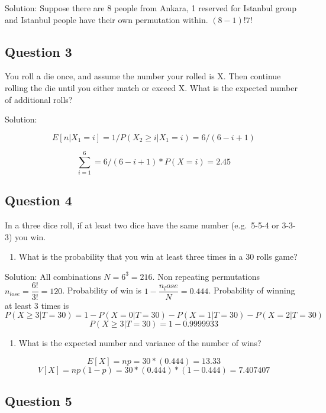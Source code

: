\documentclass[]{book}
\providecommand{\tightlist}{%
  \setlength{\itemsep}{0pt}\setlength{\parskip}{0pt}}
\theoremstyle{definition}
\theoremstyle{definition}
\theoremstyle{definition}
\theoremstyle{remark}
\begin{document}
Solution: Suppose there are 8 people from Ankara, 1 reserved for
Istanbul group and Istanbul people have their own permutation within.
\((8-1)!7!\)

\hypertarget{question-3}{%
\subsection{Question 3}\label{question-3}}

You roll a die once, and assume the number your rolled is X. Then
continue rolling the die until you either match or exceed X. What is the
expected number of additional rolls?

Solution:

\[E[n|X_1=i] = 1/P(X_2 \ge i| X_1 = i) = 6/(6-i+1)\]

\[\sum_{i=1}^6 = 6/(6-i+1) * P(X=i) = 2.45\]

\hypertarget{question-4}{%
\subsection{Question 4}\label{question-4}}

In a three dice roll, if at least two dice have the same number
(e.g.~5-5-4 or 3-3-3) you win.

\begin{enumerate}
\def\labelenumi{\alph{enumi})}
\tightlist
\item
  What is the probability that you win at least three times in a 30
  rolls game?
\end{enumerate}

Solution: All combinations \(N = 6^3 = 216\). Non repeating permutations
\(n_{lose} = \dfrac{6!}{3!} = 120\). Probability of win is
\(1 - \dfrac{n_lose}{N} = 0.444\). Probability of winning at least 3
times is
\[P(X \ge 3| T = 30) = 1 - P(X = 0|T=30) - P(X = 1|T=30) - P(X=2|T=30)\]
\[P(X \ge 3| T = 30) = 1 - 0.9999933\]

\begin{enumerate}
\def\labelenumi{\alph{enumi})}
\setcounter{enumi}{1}
\tightlist
\item
  What is the expected number and variance of the number of wins?
\end{enumerate}

\[E[X] = np = 30*(0.444) = 13.33\]
\[V[X] = np(1-p) = 30*(0.444)*(1-0.444) = 7.407407\]

\hypertarget{question-5}{%
\subsection{Question 5}\label{question-5}}
\end{document}
